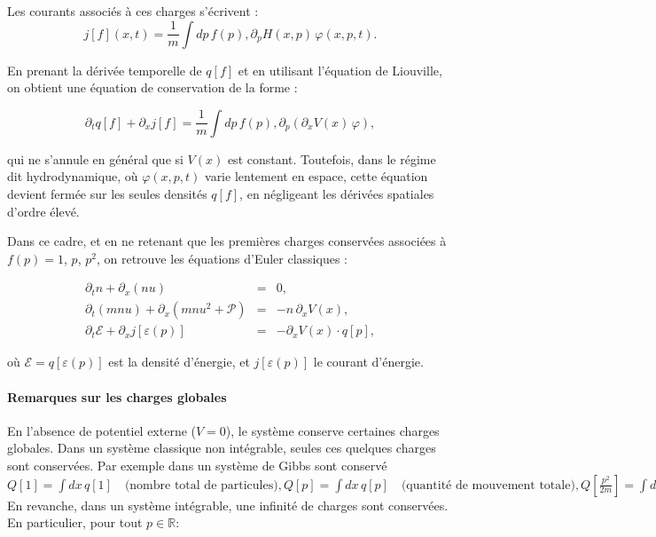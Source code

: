 Les courants associés à ces charges s’écrivent :
\begin{equation}
j[f](x, t) = \frac{1}{m} \int dp \, f(p) , \partial_p H(x, p) \, \varphi(x, p, t).
\end{equation}

En prenant la dérivée temporelle de $q[f]$ et en utilisant l’équation de Liouville, on obtient une équation de conservation de la forme :

\begin{equation}
\partial_t q[f] + \partial_x j[f] = \frac{1}{m} \int dp \, f(p) , \partial_p \left( \partial_x V(x) \, \varphi \right),
\end{equation}

qui ne s’annule en général que si $V(x)$ est constant. Toutefois, dans le régime dit hydrodynamique, où $\varphi(x,p,t)$ varie lentement en espace, cette équation devient fermée sur les seules densités $q[f]$, en négligeant les dérivées spatiales d'ordre élevé.

Dans ce cadre, et en ne retenant que les premières charges conservées associées à $f(p) = 1$, $p$, $p^2$, on retrouve les équations d’Euler classiques :

\begin{eqnarray*}
	\partial_t n + \partial_x (n u) &=& 0, \\
	\partial_t (m n u) + \partial_x (m n u^2 + \mathcal{P}) &=& -n \, \partial_x V(x), \\
	\partial_t \mathcal{E} + \partial_x j[\varepsilon(p)] &=& -\partial_x V(x) \cdot q[p],
\end{eqnarray*}

où $\mathcal{E} = q[\varepsilon(p)]$ est la densité d'énergie, et $j[\varepsilon(p)]$ le courant d'énergie.

\paragraph{Remarques sur les charges globales}
En l’absence de potentiel externe ($V = 0$), le système conserve certaines charges globales. Dans un système classique non intégrable, seules ces quelques charges sont conservées. Par exemple dans un système de Gibbs sont conservé
\(
	Q[1] = \int dx \, q[1] \quad \text{(nombre total de particules)}, 
	Q[p] = \int dx \, q[p] \quad \text{(quantité de mouvement totale)}, 
	Q\left[\frac{p^2}{2m}\right] = \int dx \, q\left[\frac{p^2}{2m}\right] \text{(énergie cinétique totale)}.
\)
En revanche, dans un système intégrable, une infinité de charges sont conservées. En particulier, pour tout $p \in \mathbb{R}$:

